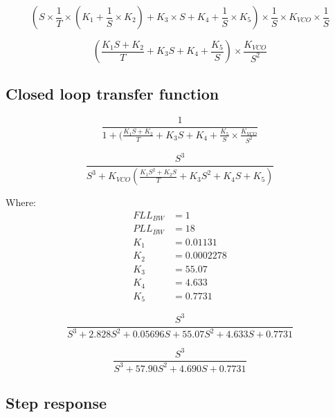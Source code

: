 \begin{equation}
(S \times \frac{1}{T} \times (K_1 + \frac{1}{S} \times K_2) + K_3 \times S + K_4 + \frac{1}{S} \times K_5) \times \frac{1}{S} \times K_{VCO} \times \frac{1}{S}
\end{equation}

\begin{equation}
(\frac{K_1 S + K_2}{T} + K_3  S + K_4 + \frac{K_5}{S} ) \times \frac{K_{VCO}}{S^2}
\end{equation}

\subsection{Closed loop transfer function}

\begin{comment}
PLL/FLL S^2 Ratio = 19.4
PLL/FLL S Ratio = 81.3339
\end{comment}

\begin{equation}
\frac{1}{1+(\frac{K_1 S + K_2}{T} + K_3  S +K_4  + \frac{K_5}{S}  \times \frac{K_{VCO}}{S^2}}
\end{equation}


\begin{equation}
\frac{S^3}{S^3 + K_{VCO}(\frac{K_1 S^2 + K_2 S}{T} + K_3 S^2 + K_4 S + K_5)}
\end{equation}

Where:
\begin{align*}
FLL_{BW}&=1\\
PLL_{BW}&=18\\
K_1 &=  0.01131\\
K_2 &=  0.0002278\\
K_3 &= 55.07\\
K_4 &= 4.633\\
K_5 &= 0.7731
\end{align*}

\begin{equation}
\frac{S^3}{S^3 +2.828 S^2 + 0.05696 S + 55.07 S^2 + 4.633 S + 0.7731}
\end{equation}

\begin{equation}
\frac{S^3}{S^3 +57.90 S^2 + 4.690 S +0.7731}
\end{equation}

\subsection{Step response}

